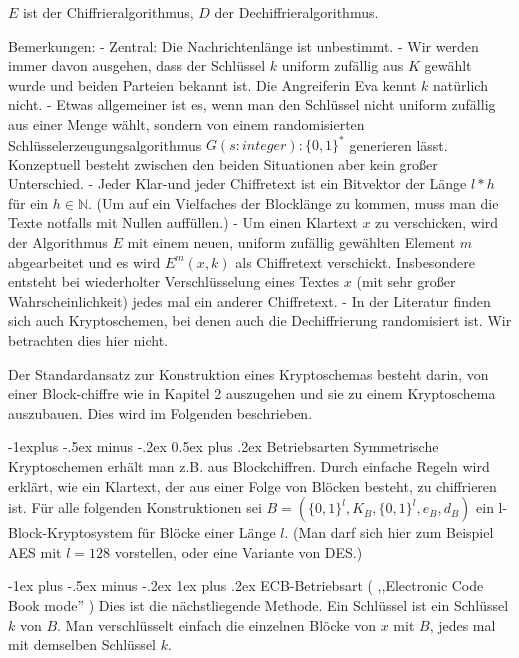 \documentclass[a4paper]{article}
\makeatletter
\renewcommand{\subsection}{\@startsection{subsection}{2}{0mm}%
 {-1explus -.5ex minus -.2ex}%
 {0.5ex plus .2ex}%
 {\normalfont\normalsize\bfseries}}
\renewcommand{\subsubsection}{\@startsection{subsubsection}{3}{0mm}%
 {-1ex plus -.5ex minus -.2ex}%
 {1ex plus .2ex}%
 {\normalfont\small\bfseries}}
\makeatother
\begin{document}
\begin{multicols}{3}
    $E$ ist der Chiffrieralgorithmus, $D$ der Dechiffrieralgorithmus.

    Bemerkungen:
    - Zentral: Die Nachrichtenlänge ist unbestimmt.
    - Wir werden immer davon ausgehen, dass der Schlüssel $k$ uniform zufällig aus $K$ gewählt wurde und beiden Parteien bekannt ist. Die Angreiferin Eva kennt $k$ natürlich nicht.
    - Etwas allgemeiner ist es, wenn man den Schlüssel nicht uniform zufällig aus einer Menge wählt, sondern von einem randomisierten Schlüsselerzeugungsalgorithmus $G(s:integer):\{0,1\}^*$ generieren lässt. Konzeptuell besteht zwischen den beiden Situationen aber kein großer Unterschied.
    - Jeder Klar-und jeder Chiffretext ist ein Bitvektor der Länge $l*h$ für ein $h\in\mathbb{N}$. (Um auf ein Vielfaches der Blocklänge zu kommen, muss man die Texte notfalls mit Nullen auffüllen.)
    - Um einen Klartext $x$ zu verschicken, wird der Algorithmus $E$ mit einem neuen, uniform zufällig gewählten Element $m$ abgearbeitet und es wird $E^m(x,k)$ als Chiffretext verschickt. Insbesondere entsteht bei wiederholter Verschlüsselung eines Textes $x$ (mit sehr großer Wahrscheinlichkeit) jedes mal ein anderer Chiffretext.
    - In der Literatur finden sich auch Kryptoschemen, bei denen auch die Dechiffrierung randomisiert ist. Wir betrachten dies hier nicht.

    Der Standardansatz zur Konstruktion eines Kryptoschemas besteht darin, von einer Block-chiffre wie in Kapitel 2 auszugehen und sie zu einem Kryptoschema auszubauen. Dies wird im Folgenden beschrieben.

    \subsection{Betriebsarten}
    Symmetrische Kryptoschemen erhält man z.B. aus Blockchiffren. Durch einfache Regeln wird erklärt, wie ein Klartext, der aus einer Folge von Blöcken besteht, zu chiffrieren ist. Für alle folgenden Konstruktionen sei $B=(\{0,1\}^l,K_B,\{0,1\}^l,e_B,d_B)$ ein l-Block-Kryptosystem für Blöcke einer Länge $l$. (Man darf sich hier zum Beispiel AES mit $l=128$ vorstellen, oder eine Variante von DES.)

    \subsubsection{ECB-Betriebsart ( ,,Electronic Code Book mode'' )}
    Dies ist die nächstliegende Methode. Ein Schlüssel ist ein Schlüssel $k$ von $B$. Man verschlüsselt einfach die einzelnen Blöcke von $x$ mit $B$, jedes mal mit demselben Schlüssel $k$.


\end{multicols}
\end{document}
